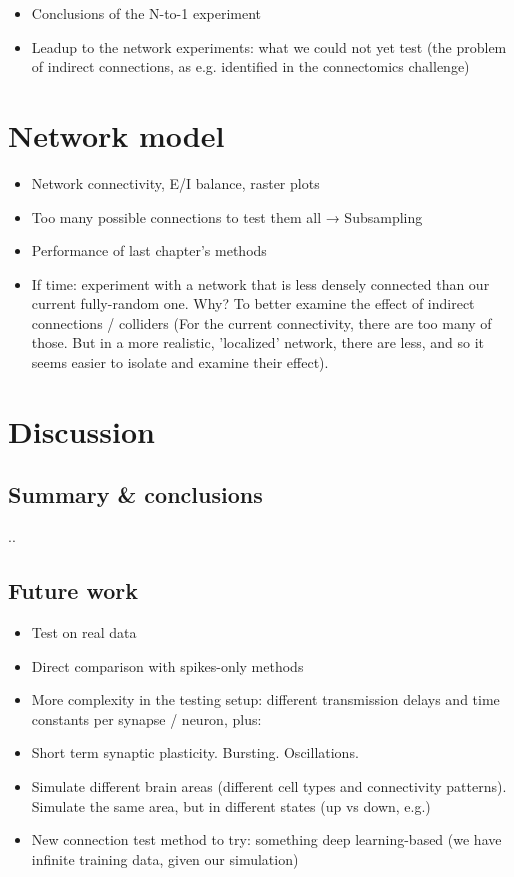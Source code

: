 \documentclass[a4paper, oneside, 11pt]{memoir}
\begin{document}
\begin{itemize}
    \item Conclusions of the N-to-1 experiment
    \item Leadup to the network experiments: what we could not yet test (the problem of indirect connections, as e.g. identified in the connectomics challenge)
\end{itemize}



\chapter{Network model}

\begin{itemize}
    \item Network connectivity, E/I balance, raster plots
    \item Too many possible connections to test them all → Subsampling
    \item Performance of last chapter's methods
    \item If time: experiment with a network that is less densely connected than our current fully-random one. Why? To better examine the effect of indirect connections / colliders (For the current connectivity, there are too many of those. But in a more realistic, 'localized' network, there are less, and so it seems easier to isolate and examine their effect).
\end{itemize}


\chapter{Discussion}

\section{Summary \& conclusions}

..

\section{Future work}

\begin{itemize}
    \item Test on real data
    \item Direct comparison with spikes-only methods
    \item More complexity in the testing setup: different transmission delays and time constants per synapse / neuron, plus:
    \item Short term synaptic plasticity. Bursting. Oscillations.
    \item Simulate different brain areas (different cell types and connectivity patterns). Simulate the same area, but in different states (up vs down, e.g.)
    \item New connection test method to try: something deep learning-based (we have infinite training data, given our simulation)
\end{itemize}

\References
\end{document}
